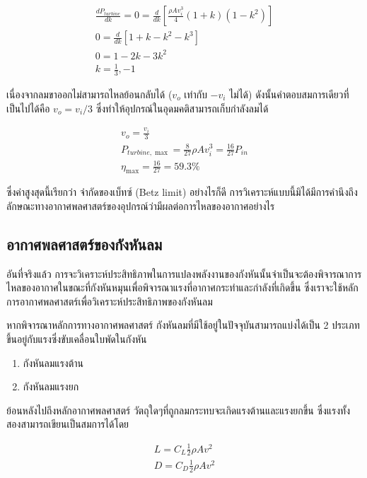 \documentclass[11pt]{article}
\begin{document}
\begin{gather}
 \frac{dP_{turbine}}{dk} = 0 = \frac{d}{dk} \left[ \frac{\rho A v_i^3}{4} \left( 1 + k \right) \left( 1 - k^2 \right) \right] \nonumber \\
    0 = \frac{d}{dk} \left[ 1 + k - k^2 - k^3 \right] \nonumber \\
    0 = 1 - 2k - 3k^2 \nonumber \\
    k = \frac{1}{3}, -1
\end{gather}

เนื่องจากลมขาออกไม่สามารถไหลย้อนกลับได้ (\(v_o\) เท่ากับ \(-v_i\) ไม่ได้) ดังนั้นคำตอบสมการเดียวที่เป็นไปได้คือ \(v_o = v_i /3\) ซึ่งทำให้อุปกรณ์ในอุดมคติสามารถเก็บกำลังลมได้

\begin{gather*}
    v_o = \frac{v_i}{3} \\
    P_{turbine, \max} = \frac{8}{27} \rho A v_i^3 = \frac{16}{27} P_{in} \\
    \eta_{\max} = \frac{16}{27} = 59.3\%
  \end{gather*}

ซึ่งค่าสูงสุดนี้เรียกว่า จำกัดของเบ็ทซ์ (Betz limit) อย่างไรก็ดี การวิเคราะห์แบบนี้มิได้มีการคำนึงถึงลักษณะทางอากาศพลศาสตร์ของอุปกรณ์ว่ามีผลต่อการไหลของอากาศอย่างไร

\subsection{อากาศพลศาสตร์ของกังหันลม}
\label{sec:org6ff954a}

อันที่จริงแล้ว การจะวิเคราะห์ประสิทธิภาพในการแปลงพลังงานของกังหันนั้นจำเป็นจะต้องพิจารณาการไหลของอากาศในขณะที่กังหันหมุนเพื่อพิจารณาแรงที่อากาศกระทำและกำลังที่เกิดขึ้น ซึ่งเราจะใช้หลักการอากาศพลศาสตร์เพื่อวิเคราะห์ประสิทธิภาพของกังหันลม

หากพิจารณาหลักการทางอากาศพลศาสตร์ กังหันลมที่มีใช้อยู่ในปัจจุบันสามารถแบ่งได้เป็น 2 ประเภทขึ้นอยู่กับแรงซึ่งขับเคลื่อนใบพัดในกังหัน

\begin{enumerate}
\item กังหันลมแรงต้าน
\item กังหันลมแรงยก
\end{enumerate}

ย้อนหลังไปถึงหลักอากาศพลศาสตร์ วัตถุใดๆที่ถูกลมกระทบจะเกิดแรงต้านและแรงยกขึ้น ซึ่งแรงทั้งสองสามารถเขียนเป็นสมการได้โดย

\begin{align}
  \label{eq:lift force}
  L = C_L \frac{1}{2} \rho A v^2 \\
  D = C_D \frac{1}{2} \rho A v^2
\end{align}
\end{document}
